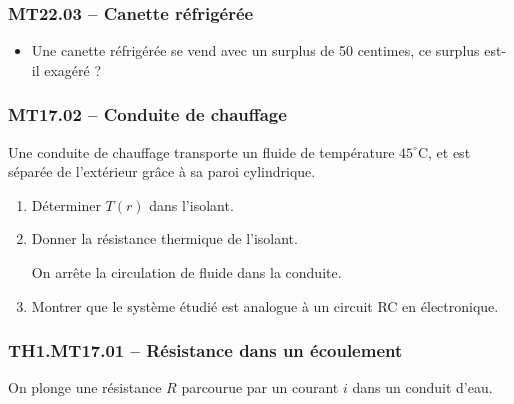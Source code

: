 \subsubsection*{MT22.03 -- Canette réfrigérée  \corrige}

\begin{itemize}[label=\textbullet]
\item Une canette réfrigérée se vend avec un surplus de 50 centimes, ce surplus est-il exagéré ?
\end{itemize}

\subsubsection*{MT17.02 -- Conduite de chauffage }

Une conduite de chauffage transporte un fluide de température $45^\circ\text{C}$, et est séparée de l'extérieur grâce à sa paroi cylindrique.

\begin{center}
\end{center}

\begin{enumerate}
\item Déterminer $T(r)$ dans l'isolant.
\item Donner la résistance thermique de l'isolant.

On arrête la circulation de fluide dans la conduite.

\item Montrer que le système étudié est analogue à un circuit RC en électronique.
\end{enumerate}

\newpage
\subsubsection*{TH1.MT17.01 -- Résistance dans un écoulement}

\begin{center}
\end{center}

On plonge une résistance $R$ parcourue par un courant $i$ dans un conduit d'eau.

